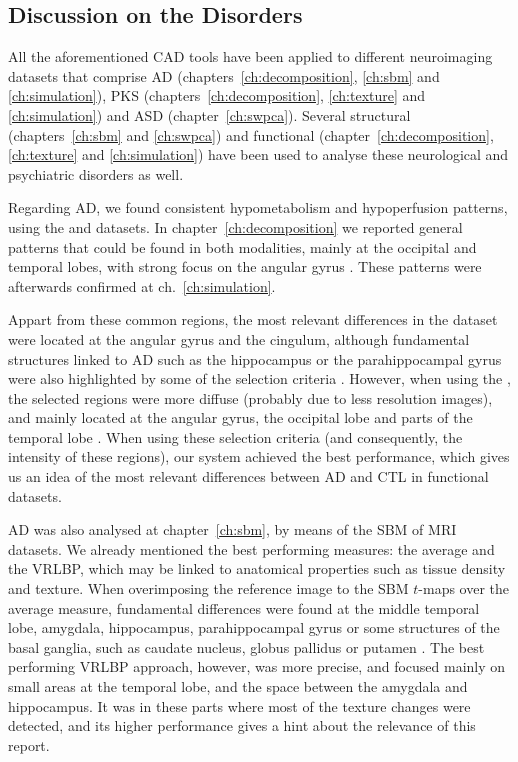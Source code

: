 \subsection{Discussion on the Disorders}
All the aforementioned \ac{CAD} tools have been applied to different neuroimaging datasets that comprise \ac{AD} (chapters~\ref{ch:decomposition}, \ref{ch:sbm} and \ref{ch:simulation}), \ac{PKS} (chapters~\ref{ch:decomposition}, \ref{ch:texture} and \ref{ch:simulation}) and \ac{ASD} (chapter~\ref{ch:swpca}). Several structural (chapters~\ref{ch:sbm} and \ref{ch:swpca}) and functional (chapter~\ref{ch:decomposition}, \ref{ch:texture} and \ref{ch:simulation}) have been used to analyse these neurological and psychiatric disorders as well. 

Regarding \ac{AD}, we found consistent hypometabolism and hypoperfusion patterns, using the \adnipet{} and \vdlnhmpao{} datasets. In chapter~\ref{ch:decomposition} we reported general patterns that could be found in both modalities, mainly at the occipital and temporal lobes, with strong focus on the angular gyrus \cite{Dubois2007,Claus1994}. These patterns were afterwards confirmed at ch.~\ref{ch:simulation}. 

Appart from these common regions, the most relevant differences in the \adnipet{} dataset were located at the angular gyrus and the cingulum, although fundamental structures linked to \ac{AD} such as the hippocampus or the parahippocampal gyrus were also highlighted by some of the selection criteria \cite{Stoeckel04,Illan2011}. However, when using the \vdlnhmpao{}, the selected regions were more diffuse (probably due to less resolution images), and mainly located at the angular gyrus, the occipital lobe and parts of the temporal lobe \cite{Dubois2007,Claus1994}. When using these selection criteria (and consequently, the intensity of these regions), our system achieved the best performance, which gives us an idea of the most relevant differences between \ac{AD} and \ac{CTL} in functional datasets. 

\ac{AD} was also analysed at chapter~\ref{ch:sbm}, by means of the \ac{SBM} of \ac{MRI} datasets. We already mentioned the best performing measures: the average and the \ac{VRLBP}, which may be linked to anatomical properties such as tissue density and texture. When overimposing the reference image to the \ac{SBM} $t$-maps over the average measure, fundamental differences were found at the middle temporal lobe, amygdala, hippocampus, parahippocampal gyrus or some structures of the basal ganglia, such as caudate nucleus, globus pallidus or putamen \cite{Dubois2007,Pievani2013}. The best performing \ac{VRLBP} approach, however, was more precise, and focused mainly on small areas at the temporal lobe, and the space between the amygdala and hippocampus. It was in these parts where most of the texture changes were detected, and its higher performance gives a hint about the relevance of this report. 

